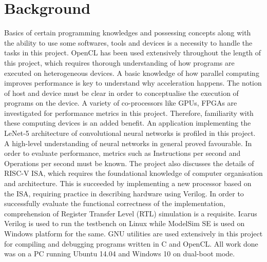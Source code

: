 \chapter{Background}
\label{ch2_background}

Basics of certain programming knowledges and possessing concepts along with the ability to use some softwares, tools and devices is a necessity to handle the tasks in this project. OpenCL has been used extensively throughout the length of this project, which requires thorough understanding of how programs are executed on heterogeneous devices. A basic knowledge of how parallel computing improves performance is key to understand why acceleration happens. The notion of host and device must be clear in order to conceptualise the execution of programs on the device.\newline\newline
A variety of co-processors like GPUs, FPGAs are investigated for performance metrics in this project. Therefore, familiarity with these computing devices is an added benefit. An application implementing the LeNet-5 architecture of convolutional neural networks is profiled in this project. A high-level understanding of neural networks in general proved favourable. In order to evaluate performance, metrics such as Instructions per second and Operations per second must be known.\newline\newline
The project also discusses the details of RISC-V ISA, which requires the foundational knowledge of computer organisation and architecture.  This is succeeded by implementing a new processor based on the ISA, requiring practice in describing hardware using Verilog. In order to successfully evaluate the functional correctness of the implementation, comprehension of Register Transfer Level (RTL) simulation is a requisite.  Icarus Verilog is used to run the testbench on Linux while ModelSim SE is used on Windows platform for the same.\newline\newline
GNU utilities are used extensively in this project for compiling and debugging programs written in C and OpenCL. All work done was on a PC running Ubuntu 14.04 and Windows 10 on dual-boot mode.